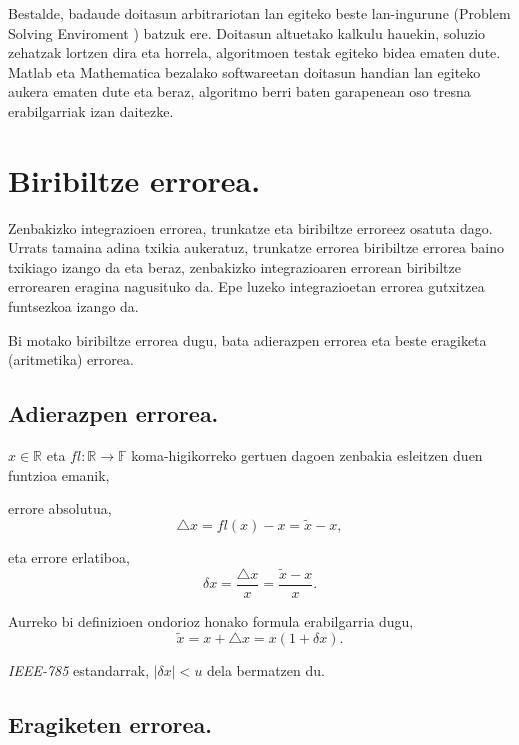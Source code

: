 Bestalde, badaude doitasun arbitrariotan lan egiteko beste lan-ingurune (Problem Solving Enviroment \cite{Higham2015}) batzuk ere. Doitasun altuetako kalkulu hauekin, soluzio zehatzak lortzen dira eta horrela, algoritmoen testak egiteko bidea ematen dute. Matlab eta Mathematica bezalako softwareetan doitasun handian lan egiteko aukera ematen dute eta beraz, algoritmo berri baten garapenean oso tresna erabilgarriak izan daitezke.

 
\section{Biribiltze errorea.}

Zenbakizko integrazioen errorea, trunkatze eta biribiltze erroreez osatuta dago. Urrats tamaina adina txikia aukeratuz, trunkatze errorea biribiltze errorea baino txikiago izango da eta beraz, zenbakizko integrazioaren errorean biribiltze errorearen eragina nagusituko da. Epe luzeko integrazioetan errorea gutxitzea funtsezkoa izango da.     

Bi motako biribiltze errorea dugu, bata adierazpen errorea eta beste eragiketa (aritmetika) errorea.  

\subsection*{Adierazpen errorea.} 

$x \in \mathbb{R}$ eta $fl: \mathbb{R} \rightarrow \mathbb{F}$ 
koma-higikorreko gertuen dagoen zenbakia esleitzen duen funtzioa emanik,

 errore absolutua,
\begin{equation*}
\triangle x= fl(x)-x= \tilde{x}-x,  
\end{equation*}    
 
eta errore erlatiboa, 
\begin{equation*}
\delta x =\frac{\triangle x}{x} = \frac{\tilde{x}-x}{x}. 
\end{equation*}

Aurreko bi definizioen ondorioz honako formula erabilgarria dugu,
\begin{equation*}
\tilde{x}= x+\triangle x = x(1+\delta x).
\end{equation*}

\emph{IEEE-785} estandarrak,  $|\delta x|<u$ dela bermatzen du.

\subsection*{Eragiketen errorea.} 
 
